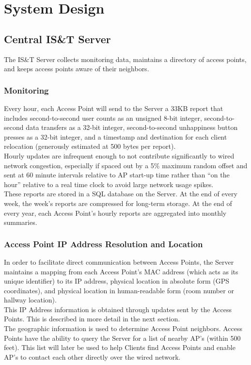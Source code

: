 \documentclass[11pt,twocolumn]{article}
\begin{document}
\section{System Design}

\subsection{Central IS\&T Server}
\indent The IS\&T Server collects monitoring data, maintains a directory of access points, and keeps access points aware of their neighbors.
\subsubsection{Monitoring}
\indent Every hour, each Access Point will send to the Server a 33KB report that includes second-to-second user counts as an unsigned 8-bit integer, second-to-second data transfers as a 32-bit integer, second-to-second unhappiness button presses as a 32-bit integer, and a timestamp and destination for each client relocation (generously estimated at 500 bytes per report).\\
\indent Hourly updates are infrequent enough to not contribute significantly to wired network congestion, especially if spaced out by a 5\% maximum random offset and sent at 60 minute intervals relative to AP start-up time rather than “on the hour” relative to a real time clock to avoid large network usage spikes.\\
\indent These reports are stored in a SQL database on the Server. At the end of every week, the week’s reports are compressed for long-term storage. At the end of every year, each Access Point’s hourly reports are aggregated into monthly summaries.

\subsubsection{Access Point IP Address Resolution and Location}
\indent In order to facilitate direct communication between Access Points, the Server maintains a mapping from each Access Point’s MAC address (which acts as its unique identifier) to its IP address, physical location in absolute form (GPS coordinates), and physical location in human-readable form (room number or hallway location).\\
\indent This IP Address information is obtained through updates sent
by the Access Points. This is described in more detail in the next section.\\
\indent The geographic information is used to determine Access Point
neighbors. Access Points have the ability to query the Server for a 
list of nearby AP's (within 500 feet). This list will later be used to
help Clients find Access Points and enable AP's to contact each other directly over the wired network.\\
\end{document}
